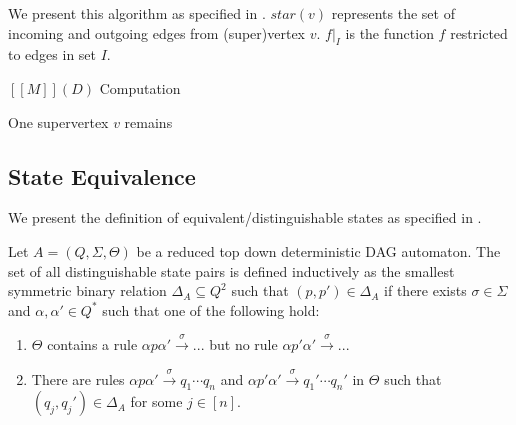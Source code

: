 \documentclass[11pt]{article}
\begin{document}
We present this algorithm as specified in \cite{chiang2018weighted}. $star(v)$
represents the set of incoming and outgoing edges from (super)vertex $v$. $f|_I$
is the function $f$ restricted to edges in set $I$. 

\begin{algorithm*}[H]
  \caption{$[[M]](D)$ Computation}
  \label{alg:chiangrecognition}
  One supervertex $v$ remains\\
  \Return{$\aalpha[v,\emptyset]$}
\end{algorithm*}


\subsection{State Equivalence}
We present the definition of equivalent/distinguishable states as specified in
\cite{blum2019properties}.

\begin{definition}
  Let $A=(Q,\Sigma, \Theta)$ be a reduced top down deterministic DAG automaton.
  The set of all distinguishable state pairs is defined inductively as the
  smallest symmetric binary relation $\Delta_A \subseteq Q^2$ such that $(p,p')
  \in \Delta_A$ if there exists $\sigma \in \Sigma$ and $\alpha, \alpha' \in
  Q^*$ such that one of the following hold:
  \begin{enumerate}
    \item $\Theta$ contains a rule $\alpha p \alpha' \xrightarrow{\sigma} ...$
    but no rule $\alpha p' \alpha' \xrightarrow{\sigma} ...$
    \item There are rules $\alpha p \alpha' \xrightarrow{\sigma} q_1\cdots q_n$
    and $\alpha p' \alpha' \xrightarrow{\sigma} q_1'\cdots q_n'$ in $\Theta$
    such that $(q_j,q_j') \in \Delta_A$ for some $j \in [n]$.
  \end{enumerate}
\end{definition}
\end{document}
